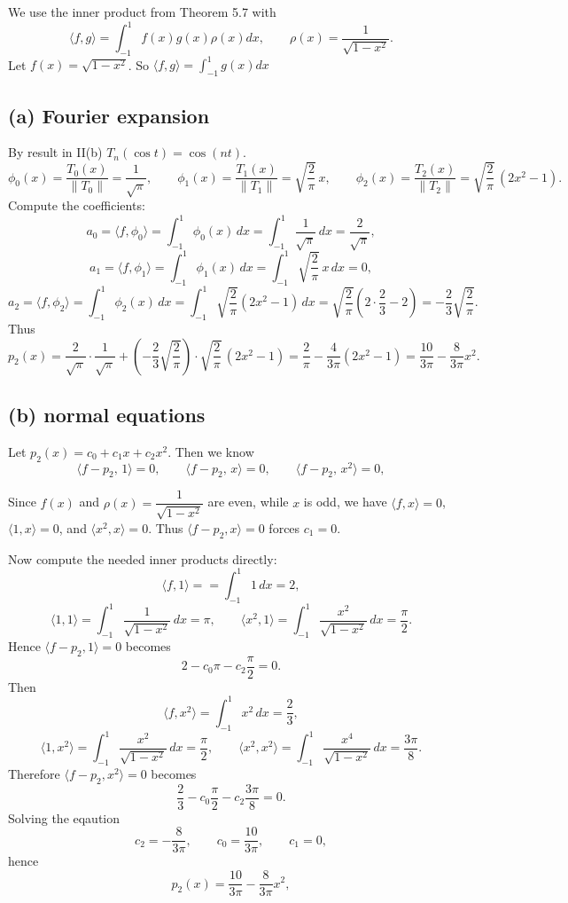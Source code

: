 \documentclass[a4paper]{article}
\begin{document}
We use the inner product from Theorem 5.7 with
\[
\langle f,g\rangle=\int_{-1}^{1} f(x)g(x)\rho(x)dx,
\qquad 
\rho(x)=\frac{1}{\sqrt{1-x^2}}.
\]
Let $f(x)=\sqrt{1-x^2}$. So \(\langle f,g\rangle=\int_{-1}^{1} g(x)dx\)

\subsection*{(a) Fourier expansion}

By result in II(b) $T_n(\cos t)=\cos(nt)$. \[
\phi_0(x)=\frac{T_0(x)}{\|T_0\|}=\frac{1}{\sqrt{\pi}},\qquad
\phi_1(x)=\frac{T_1(x)}{\|T_1\|}=\sqrt{\frac{2}{\pi}}\,x,\qquad
\phi_2(x)=\frac{T_2(x)}{\|T_2\|}=\sqrt{\frac{2}{\pi}}\,(2x^2-1).
\]
Compute the coefficients:
\[
a_0=\langle f,\phi_0\rangle
=\int_{-1}^{1}\phi_0(x)\,dx
=\int_{-1}^{1}\frac{1}{\sqrt{\pi}}\,dx
=\frac{2}{\sqrt{\pi}},
\]
\[
a_1=\langle f,\phi_1\rangle
=\int_{-1}^{1}\phi_1(x)\,dx
=\int_{-1}^{1}\sqrt{\frac{2}{\pi}}\,x\,dx
=0,
\]
\[
a_2=\langle f,\phi_2\rangle
=\int_{-1}^{1}\phi_2(x)\,dx
=\int_{-1}^{1}\sqrt{\frac{2}{\pi}}(2x^2-1)\,dx
=\sqrt{\frac{2}{\pi}}\left(2\cdot\frac{2}{3}-2\right)
=-\frac{2}{3}\sqrt{\frac{2}{\pi}}.
\]
Thus
\[
p_2(x)=\frac{2}{\sqrt{\pi}}\cdot\frac{1}{\sqrt{\pi}}
+\left(-\frac{2}{3}\sqrt{\frac{2}{\pi}}\right)\cdot\sqrt{\frac{2}{\pi}}\,(2x^2-1)
=\frac{2}{\pi}-\frac{4}{3\pi}(2x^2-1)
=\frac{10}{3\pi}-\frac{8}{3\pi}x^2.
\]

\subsection*{(b) normal equations}

Let $p_2(x)=c_0+c_1x+c_2x^2$. Then we know
\[
\langle f-p_2,\,1\rangle=0,\qquad
\langle f-p_2,\,x\rangle=0,\qquad
\langle f-p_2,\,x^2\rangle=0,
\]

Since $f(x)$ and $\rho(x)=\dfrac{1}{\sqrt{1-x^2}}$ are even, while $x$ is odd,
we have $\langle f,x\rangle=0$, $\langle 1,x\rangle=0$, and $\langle x^2,x\rangle=0$.
Thus $\langle f-p_2,x\rangle=0$ forces $c_1=0$.

Now compute the needed inner products directly:
\[
\langle f,1\rangle=
=\int_{-1}^{1}1\,dx=2,
\]
\[
\langle 1,1\rangle=\int_{-1}^{1}\frac{1}{\sqrt{1-x^2}}\,dx=\pi,
\qquad
\langle x^2,1\rangle=\int_{-1}^{1}\frac{x^2}{\sqrt{1-x^2}}\,dx=\frac{\pi}{2}.
\]
Hence $\langle f-p_2,1\rangle=0$ becomes
\[
2-c_0\pi-c_2\frac{\pi}{2}=0.
\]
Then
\[
\langle f,x^2\rangle
=\int_{-1}^{1}x^2\,dx=\frac{2}{3},
\]
\[
\langle 1,x^2\rangle=\int_{-1}^{1}\frac{x^2}{\sqrt{1-x^2}}\,dx=\frac{\pi}{2},
\qquad
\langle x^2,x^2\rangle=\int_{-1}^{1}\frac{x^4}{\sqrt{1-x^2}}\,dx=\frac{3\pi}{8}.
\]
Therefore $\langle f-p_2,x^2\rangle=0$ becomes
\[
\frac{2}{3}-c_0\frac{\pi}{2}-c_2\frac{3\pi}{8}=0.
\]
Solving the eqaution
\[
c_2=-\frac{8}{3\pi},\qquad c_0=\frac{10}{3\pi},\qquad c_1=0,
\]
hence
\[
p_2(x)=\frac{10}{3\pi}-\frac{8}{3\pi}x^2,
\]
\end{document}
